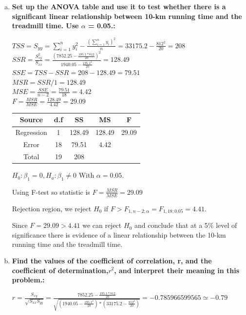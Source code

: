 \documentclass{article}
\begin{document}
\begin{enumerate}[1.]
\begin{enumerate}[(a)]
  \item \textbf{ Set up the ANOVA table and use it to test whether there is a significant linear relationship between 10-km running time and the treadmill time. Use $\alpha$ = 0.05.: }

$TSS = S_{yy} = \sum_{i=1}^{n}{y_i^2} - \frac{ (\sum_{i=1}^{n}{y_i})^2 }{n} = 33175.2 - \frac{812^2}{20} = 208 $ \\
$SSR = \frac{S_{xy}^2}{S_{xx}} = \frac{ (7852.25 - \frac{195.1 * 812}{20})^2}{ 1940.05 - \frac{195.1^2}{20}} = 128.49 $ \\
$SSE = TSS - SSR = 208 - 128.49 = 79.51 $ \\ 
$MSR = SSR/1 = 128.49 $ \\ 
$MSE = \frac{SSE}{n-2} = \frac{79.51}{18} = 4.42$ \\
$F = \frac{MSR}{MSE} = \frac{128.49}{4.42} =  29.09 $ \\

\begin{center}
 \begin{tabular}{||c c c c c||} 
 \hline
Source & d.f & SS & MS & F \\ [0.5ex] 
 \hline\hline
Regression & 1 & 128.49 & 128.49 & 29.09 \\
 \hline
Error & 18 & 79.51 & 4.42 &  \\
 \hline
Total & 19  & 208 & & \\ [1ex]
 \hline
\end{tabular}
\end{center}

$H_0: \beta_1 = 0, H_a: \beta_1 \neq 0$
With $\alpha = 0.05$.

Using F-test so statistic is $F = \frac{MSR}{MSE} = 29.09$

Rejection region, we reject $H_0$ if $F > F_{1,n-2;\alpha} = F_{1,18;0.05} = 4.41$.

Since $F = 29.09 > 4.41$ we can reject $H_0$ and conclude that at a 5\% level of significance there is evidence of a linear relationship between the 10-km running time and the treadmill time. 

  \item \textbf{ Find the values of the coefficient of correlation, r, and the coefficient of determination,$r^2$, and interpret their meaning in this problem.: }

$r = \frac{S_{xy}}{\sqrt{S_{xx}S_{yy}}} = \frac{7852.25-\frac{195.1*812}{20}}{\sqrt{ (1940.05 - \frac{195.1^2}{20}) * (33175.2-\frac{812^2}{20})}} = -0.785966599565 \simeq -0.79$ \\


\end{enumerate}
\end{enumerate}
\end{document}
